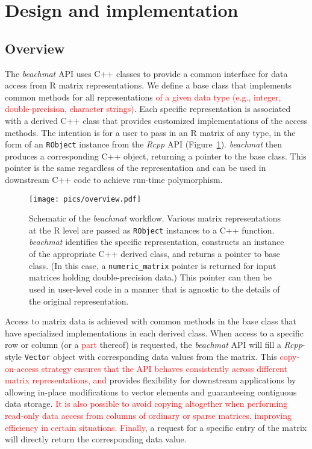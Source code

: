 \documentclass[10pt,letterpaper]{article}
\newcommand{\beachmat}{\textit{beachmat}}
\newcommand{\code}[1]{\texttt{#1}}
\newcommand{\revised}[1]{\textcolor{red}{#1}}
\begin{document}
\section*{Design and implementation}

\subsection*{Overview}
The \beachmat{} API uses C++ classes to provide a common interface for data access from R matrix representations.
We define a base class that implements common methods for all representations \revised{of a given data type (e.g., integer, double-precision, character strings)}.
Each specific representation is associated with a derived C++ class that provides customized implementations of the access methods.
The intention is for a user to pass in an R matrix of any type, in the form of an \code{RObject} instance from the \textit{Rcpp} API (Figure~\ref{fig:beachoverview}).
\beachmat{} then produces a corresponding C++ object, returning a pointer to the base class.
This pointer is the same regardless of the representation and can be used in downstream C++ code to achieve run-time polymorphism.

\begin{figure}[btp]
    \begin{center}
        \texttt{[image: pics/overview.pdf]}
    \end{center}
    \caption{Schematic of the \beachmat{} workflow.
        Various matrix representations at the R level are passed as \code{RObject} instances to a C++ function.
        \beachmat{} identifies the specific representation, constructs an instance of the appropriate C++ derived class, and returns a pointer to base class.
        (In this case, a \code{numeric\_matrix} pointer is returned for input matrices holding double-precision data.)
        This pointer can then be used in user-level code in a manner that is agnostic to the details of the original representation.
    }
    \label{fig:beachoverview}
\end{figure}

Access to matrix data is achieved with common methods in the base class that have specialized implementations in each derived class. 
When access to a specific row or column (or a \revised{part} thereof) is requested, the \beachmat{} API will fill a \textit{Rcpp}-style \code{Vector} object with corresponding data values from the matrix.
This \revised{copy-on-access strategy ensures that the API behaves consistently across different matrix representations, and} provides flexibility for downstream applications by allowing in-place modifications to vector elements and guaranteeing contiguous data storage. 
\revised{It is also possible to avoid copying altogether when performing read-only data access from columns of ordinary or sparse matrices, improving efficiency in certain situations.
Finally,} a request for a specific entry of the matrix will directly return the corresponding data value.
\end{document}
